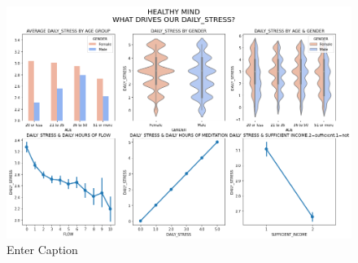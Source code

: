 \begin{figure}
    \centering
    \includegraphics[width=1.5\linewidth]{__results___16_0.png}
    \caption{Enter Caption}
    \label{fig:enter-label}
\end{figure}